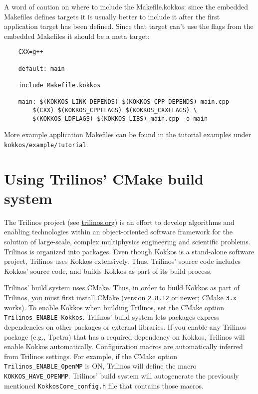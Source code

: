     A word of caution on where to include the Makefile.kokkos:
    since the embedded Makefiles defines targets it is usually
    better to include it after the first application target
    has been defined. Since that target can't use the flags
    from the embedded Makefiles it should be a meta target:

\begin{lstlisting}    
    CXX=g++
    
    default: main
    
    include Makefile.kokkos
    
    main: $(KOKKOS_LINK_DEPENDS) $(KOKKOS_CPP_DEPENDS) main.cpp
        $(CXX) $(KOKKOS_CPPFLAGS) $(KOKKOS_CXXFLAGS) \
        $(KOKKOS_LDFLAGS) $(KOKKOS_LIBS) main.cpp -o main
\end{lstlisting}

More example application Makefiles can be found in the tutorial examples under \verb!kokkos/example/tutorial!.

\section{Using Trilinos' CMake build system}\label{S:build:Trilinos}

The Trilinos project (see \url{trilinos.org}) is an effort to develop
algorithms and enabling technologies within an object-oriented
software framework for the solution of large-scale, complex
multiphysics engineering and scientific problems.  Trilinos is
organized into packages.  Even though Kokkos is a stand-alone software
project, Trilinos uses Kokkos extensively.  Thus, Trilinos' source
code includes Kokkos' source code, and builds Kokkos as part of its
build process.

Trilinos' build system uses CMake.  Thus, in order to build Kokkos as
part of Trilinos, you must first install CMake (version
\texttt{2.8.12} or newer; CMake \texttt{3.x} works).  
To enable Kokkos when building Trilinos, set the CMake option \verb!Trilinos_ENABLE_Kokkos!.
Trilinos' build system lets packages express dependencies on other packages or external libraries.
If you enable any Trilinos package (e.g., Tpetra) that has a required dependency on Kokkos, 
Trilinos will enable Kokkos automatically.
Configuration macros are automatically inferred from Trilinos settings. 
For example, if the CMake option \lstinline|Trilinos_ENABLE_OpenMP| is ON, Trilinos will define the macro \lstinline|KOKKOS_HAVE_OPENMP|.
Trilinos' build system will autogenerate the previously mentioned \lstinline|KokkosCore_config.h| file that contains those macros. 

